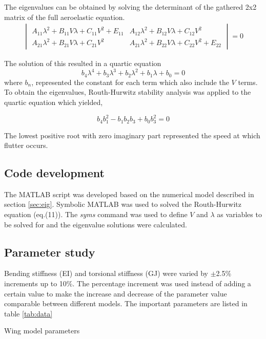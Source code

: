 \documentclass[11pt]{article}
\begin{document}
The eigenvalues can be obtained by solving the determinant of the gathered 2x2 matrix of the full aeroelastic equation.\\

\begin{equation}
    \begin{gathered}
    \begin{vmatrix} A_{11}\lambda^2+B_{11}V\lambda+C_{11}V^2+E_{11} & A_{12}\lambda^2+B_{12}V\lambda+C_{12}V^2\\
    A_{21}\lambda^2+B_{21}V\lambda+C_{21}V^2&A_{21}\lambda^2+B_{22}V\lambda+C_{22}V^2+E_{22}\end{vmatrix}=0
    \end{gathered}
\end{equation}

The solution of this resulted in a quartic equation\\
\begin{equation}\label{eq:b_n}
    b_4\lambda^4+b_3\lambda^3+b_2\lambda^2+b_1\lambda+b_0 = 0
\end{equation}
where $b_n$, represented the constant for each term which also include the $V$ terms.\\

To obtain the eigenvalues, Routh-Hurwitz stability analysis was applied to the quartic equation which yielded,

\begin{equation}
    b_4b_1^2-b_1b_2b_3+b_0b_3^2 = 0
\end{equation}

The lowest positive root with zero imaginary part represented the speed at which flutter occurs.

\subsection{Code development}
The MATLAB script was developed based on the numerical model described in section \ref{sec:eig}. Symbolic MATLAB was used to solved the Routh-Hurwitz equation (eq.(11)). The \textit{syms} command was used to define $V$ and $\lambda$ as variables to be solved for and the eigenvalue solutions were calculated.        

\subsection{Parameter study}
Bending stiffness (EI) and torsional stiffness (GJ) were varied by $\pm$2.5\% increments up to 10\%. The percentage increment was used instead of adding a certain value to make the increase and decrease of the parameter value comparable between different models. The important parameters are listed in table \ref{tab:data}
\begin{table}[H]
    \centering
    \caption{Wing model parameters}
    
    \label{tab:data}
\end{table}
\end{document}
